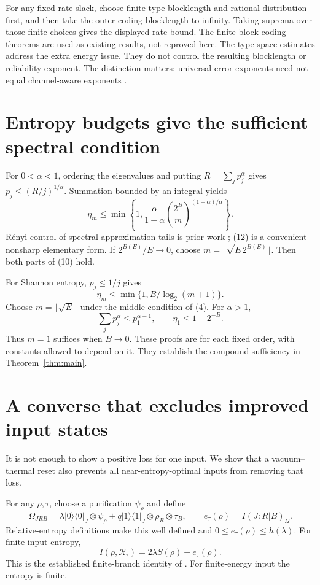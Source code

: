 \documentclass[11pt]{article}
\newcommand{\Rcal}{\mathcal R}
\begin{document}
For any fixed rate slack, choose finite type blocklength and rational
distribution first, and then take the outer coding blocklength to infinity.
Taking suprema over those finite choices gives the displayed rate bound.
The finite-block coding theorems are used as existing results, not
reproved here. The type-space estimates address the extra energy issue.
They do not control the resulting blocklength or reliability exponent.
The distinction matters: universal error exponents need not equal
channel-aware exponents \cite{reliability}.

\section{Entropy budgets give the sufficient spectral condition}
For \(0<\alpha<1\), ordering the eigenvalues and putting
\(R=\sum_jp_j^\alpha\) gives \(p_j\le(R/j)^{1/\alpha}\).
Summation bounded by an integral yields
\[
 \eta_m\le
 \min\left\{1,\frac{\alpha}{1-\alpha}
       \left(\frac{2^B}{m}\right)^{(1-\alpha)/\alpha}\right\}.    \tag{12}
\]
R\'enyi control of spectral approximation tails is prior work
\cite[Lemma 2]{vc}; (12) is a convenient nonsharp elementary form.
If \(2^{B(E)}/E\to0\), choose
\(m=\lfloor\sqrt{E\,2^{B(E)}}\rfloor\). Then both parts of (10) hold.

For Shannon entropy, \(p_j\le1/j\) gives
\[
 \eta_m\le\min\{1,B/\log_2(m+1)\}.                              \tag{13}
\]
Choose \(m=\lfloor\sqrt E\rfloor\) under the middle condition of (4).
For \(\alpha>1\),
\[
 \sum_jp_j^\alpha\le p_1^{\alpha-1},\qquad
 \eta_1\le1-2^{-B}.                                           \tag{14}
\]
Thus \(m=1\) suffices when \(B\to0\).
These proofs are for each fixed order, with constants allowed to depend
on it. They establish the compound sufficiency in Theorem~\ref{thm:main}.

\section{A converse that excludes improved input states}
It is not enough to show a positive loss for one input.
We show that a vacuum--thermal reset also prevents all near-entropy-optimal
inputs from removing that loss.

For any \(\rho,\tau\), choose a purification \(\psi_\rho\) and define
\[
 \Omega_{JRB}=
 \lambda|0\rangle\langle0|_J\otimes\psi_\rho+
 q|1\rangle\langle1|_J\otimes\rho_R\otimes\tau_B,\qquad
 e_\tau(\rho)=I(J:R|B)_\Omega .
\]
Relative-entropy definitions make this well defined and
\(0\le e_\tau(\rho)\le h(\lambda)\).
For finite input entropy,
\[
 I(\rho,\Rcal_\tau)=2\lambda S(\rho)-e_\tau(\rho).              \tag{15}
\]
This is the established finite-branch identity of \cite{prior}.
For finite-energy input the entropy is finite.
\end{document}
